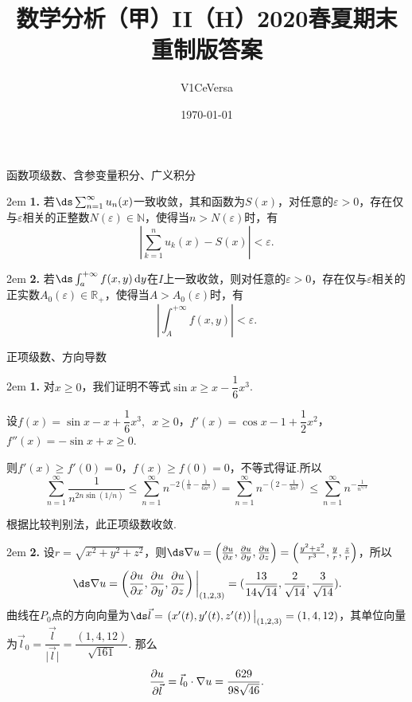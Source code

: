 \documentclass[UTF8,14pt,normal]{ctexart}
\title{数学分析（甲）II（H）2020春夏期末\quad 重制版答案}
\author{V1CeVersa}
\date{\today}
\begin{document}
\maketitle

 函数项级数、含参变量积分、广义积分

    \hangindent 2em
    \noindent
    \textbf{1.}
    若\(\ds \sum_{n=1}^{\infty}u_n(x)\)一致收敛，其和函数为\(S(x)\)，对任意的\(\varepsilon>0\)，存在仅与\(\varepsilon\)相关的正整数\(N(\varepsilon)\in\mathbb{N}\)，使得当\(n>N(\varepsilon)\)时，有\[\left|\sum_{k=1}^{n}u_k(x)-S(x)\right|<\varepsilon.\]

    \hangindent 2em
    \noindent
    \textbf{2.}
    若\(\ds\int_{a}^{+\infty}f(x,y)\dd{y}\)在\(I\)上一致收敛，则对任意的\(\varepsilon>0\)，存在仅与\(\varepsilon\)相关的正实数\(A_0(\varepsilon)\in\mathbb{R}_{+}\)，使得当\(A>A_0(\varepsilon)\)时，有\[\left|\int_{A}^{+\infty}f(x,y)\right|<\varepsilon.\]

 正项级数、方向导数

    \hangindent 2em
    \noindent
    \textbf{1.}
    对\(x\geqslant0\)，我们证明不等式\(\sin x\geqslant x-\dfrac{1}{6}x^3\).

    设\(f(x)=\sin x-x +\dfrac{1}{6}x^3,\enspace x\geqslant0\)，\(f'(x) = \cos x -1 +\dfrac{1}{2}x^2\)，\(f''(x) = -\sin x+x\geqslant0\).

    则\(f'(x)\geqslant f'(0) = 0\)，\(f(x)\geqslant f(0)= 0\)，不等式得证.所以
    \[\sum_{n=1}^{\infty}\frac{1}{n^{2n\sin(1/n)}}\leqslant\sum_{n=1}^{\infty}n^{-2(\frac{1}{n}-\frac{1}{6n^3})} = \sum_{n=1}^{\infty}n^{-(2-\frac{1}{3n^2})}\leqslant\sum_{n=1}^{\infty}n^{-\frac{1}{n^{5/3}}}\]

    根据比较判别法，此正项级数收敛.

    \hangindent 2em
    \noindent
    \textbf{2.}
    设\(r=\sqrt{x^2+y^2+z^2}\)，则\(\ds \nabla u = \left(\pdv{u}{x},\pdv{u}{y},\pdv{u}{z}\right) = \left(\frac{y^2 + z^2}{r^3},\frac{y}{r},\frac{z}{r}\right)\)，所以
    \[\eval{\ds \nabla u = \left(\pdv{u}{x},\pdv{u}{y},\pdv{u}{z}\right)}_{(1, 2, 3)} =(\dfrac{13}{14\sqrt{14}}, \dfrac{2}{\sqrt{14}}, \dfrac{3}{\sqrt{14}}).\]
    曲线在\(P_0\)点的方向向量为\(\ds \vec{l} = \eval{\left(x'(t),y'(t),z'(t)\right)}_{(1,2,3)} = (1,4,12)\)，其单位向量为\(\vec{l}_0 = \dfrac{\vec{l}}{\lvert\vec{l}\rvert} = \dfrac{(1,4,12)}{\sqrt{161}}\).
    那么\[\pdv{u}{\vec{l}} = \vec{l}_0\cdot\nabla u = \frac{629}{98\sqrt{46}}.\]
\end{document}
